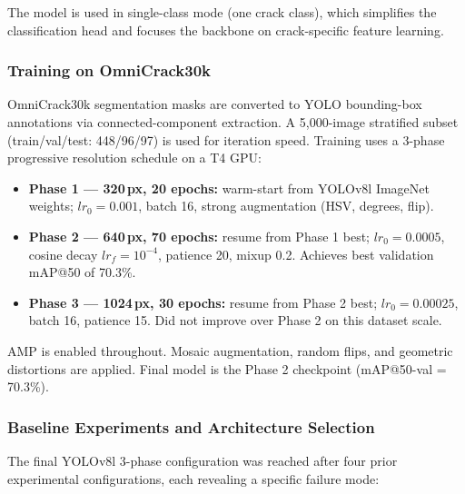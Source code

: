 \documentclass[12pt,a4paper]{article}
\begin{document}
The model is used in single-class mode (one crack class), which simplifies the classification head and focuses the backbone on crack-specific feature learning.

\subsubsection{Training on OmniCrack30k}

OmniCrack30k segmentation masks are converted to YOLO bounding-box annotations via connected-component extraction. A 5{,}000-image stratified subset (train/val/test: 448/96/97) is used for iteration speed. Training uses a 3-phase progressive resolution schedule on a T4 GPU:

\begin{itemize}[leftmargin=1.5cm]
  \item \textbf{Phase 1 — 320\,px, 20 epochs:} warm-start from YOLOv8l ImageNet weights; $lr_0=0.001$, batch 16, strong augmentation (HSV, degrees, flip).
  \item \textbf{Phase 2 — 640\,px, 70 epochs:} resume from Phase 1 best; $lr_0=0.0005$, cosine decay $lr_f=10^{-4}$, patience 20, mixup 0.2. Achieves best validation mAP@50 of 70.3\%.
  \item \textbf{Phase 3 — 1024\,px, 30 epochs:} resume from Phase 2 best; $lr_0=0.00025$, batch 16, patience 15. Did not improve over Phase 2 on this dataset scale.
\end{itemize}

AMP is enabled throughout. Mosaic augmentation, random flips, and geometric distortions are applied. Final model is the Phase 2 checkpoint (mAP@50-val = 70.3\%).

\subsubsection{Baseline Experiments and Architecture Selection}
\label{sec:det_baseline}

The final YOLOv8l 3-phase configuration was reached after four prior experimental configurations, each revealing a specific failure mode:
\end{document}
